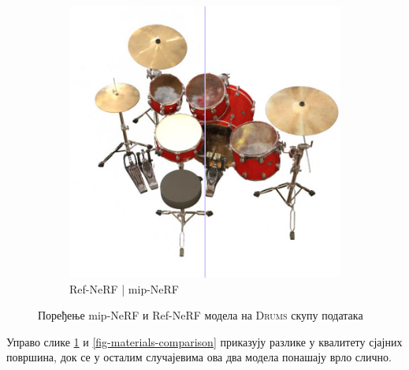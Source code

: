 \documentclass[12pt, a4paper, twoside]{book}
\numberwithin{equation}{chapter}
\numberwithin{theorem}{section}
\numberwithin{definition}{section}
\numberwithin{definitionChapter}{chapter}
\begin{document}
\begin{figure}[H]
\begin{subfigure}{0.475\textwidth}
			\includegraphics[scale=0.25]{img/comparison/refnerf_vs_mipnerf_drums_3.png}
			\caption{Ref-NeRF | mip-NeRF}
		\end{subfigure}
		\caption{Поређење mip-NeRF и Ref-NeRF модела на \textsc{Drums} скупу података}
		\label{fig-drums-comparison}
	\end{figure}

Управо слике \ref{fig-drums-comparison} и \ref{fig-materials-comparison} приказују разлике у квалитету
сјајних површина, док се у осталим случајевима ова два модела понашају врло слично.
\end{document}
